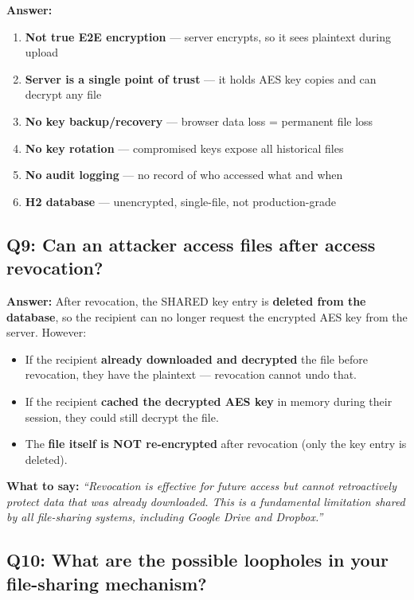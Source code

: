 \documentclass[11pt,a4paper]{article}
\begin{document}
\textbf{Answer:}
\begin{enumerate}
  \item \textbf{Not true E2E encryption} --- server encrypts, so it sees plaintext during upload
  \item \textbf{Server is a single point of trust} --- it holds AES key copies and can decrypt any file
  \item \textbf{No key backup/recovery} --- browser data loss = permanent file loss
  \item \textbf{No key rotation} --- compromised keys expose all historical files
  \item \textbf{No audit logging} --- no record of who accessed what and when
  \item \textbf{H2 database} --- unencrypted, single-file, not production-grade
\end{enumerate}

\subsection{Q9: Can an attacker access files after access revocation?}

\textbf{Answer:} After revocation, the SHARED key entry is \textbf{deleted from the database}, so the recipient can no longer request the encrypted AES key from the server. However:

\begin{itemize}
  \item If the recipient \textbf{already downloaded and decrypted} the file before revocation, they have the plaintext --- revocation cannot undo that.
  \item If the recipient \textbf{cached the decrypted AES key} in memory during their session, they could still decrypt the file.
  \item The \textbf{file itself is NOT re-encrypted} after revocation (only the key entry is deleted).
\end{itemize}

\textbf{What to say:} \textit{``Revocation is effective for future access but cannot retroactively protect data that was already downloaded. This is a fundamental limitation shared by all file-sharing systems, including Google Drive and Dropbox.''}

\subsection{Q10: What are the possible loopholes in your file-sharing mechanism?}
\end{document}
